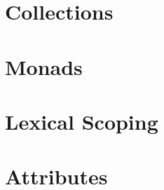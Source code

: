 \documentclass[sigplan,10pt]{acmart}
\begin{document}
\section{Collections}

\section{Monads}

\section{Lexical Scoping}

\section{Attributes}

%

%
%
\end{document}
